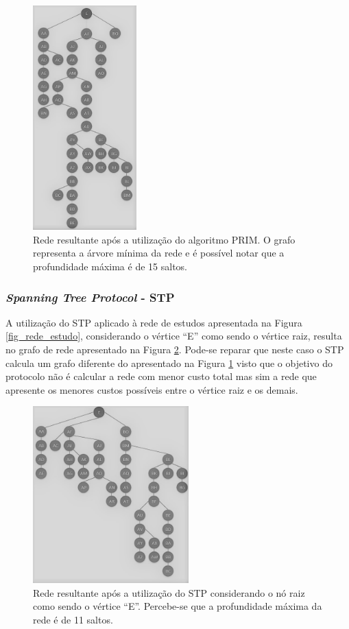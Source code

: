 \documentclass[12pt]{article}
\begin{document}
\begin{figure} %
	\centering
	\includegraphics[width=4cm]{Otimizada_Prim_PB}
	\caption{Rede resultante após a utilização do algoritmo PRIM. O grafo representa a árvore mínima da rede e é possível notar que a profundidade máxima é de 15 saltos.}
	\label{fig_rede_otimizada_prim}
\end{figure}

\subsubsection{\emph{Spanning Tree Protocol} - STP}
A utilização do STP aplicado à rede de estudos apresentada na Figura \ref{fig_rede_estudo}, considerando o vértice ``E'' como sendo o vértice raiz, resulta no grafo de rede apresentado na Figura \ref{fig_rede_otimizada_STP}. Pode-se reparar que neste caso o STP calcula um grafo diferente do apresentado na Figura \ref{fig_rede_otimizada_prim} visto que o objetivo do protocolo não é calcular a rede com menor custo total mas sim a rede que apresente os menores custos possíveis entre o vértice raiz e os demais.

\begin{figure} %
	\centering
	\includegraphics[width=6cm]{Otimizada_STP_PB}
	\caption{Rede resultante após a utilização do STP considerando o nó raiz como sendo o vértice ``E''. Percebe-se que a profundidade máxima da rede é de 11 saltos.}
	\label{fig_rede_otimizada_STP}
\end{figure}
\end{document}

